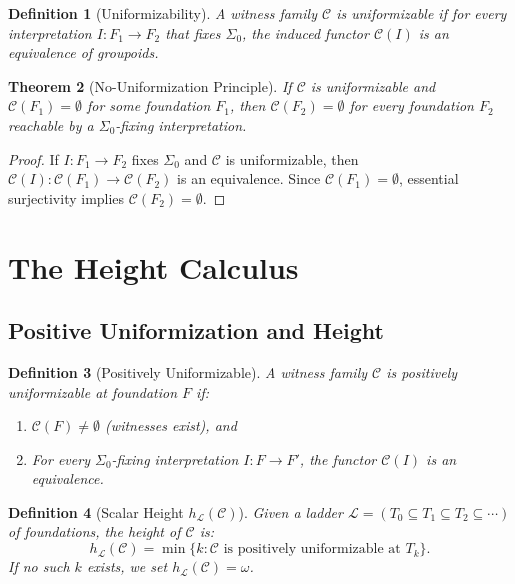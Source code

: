 \documentclass[11pt]{article}
\newtheorem{theorem}{Theorem}[section]
\newtheorem{definition}[theorem]{Definition}
\newcommand{\SigmaZero}{\Sigma_{0}}
\begin{document}
\begin{definition}[Uniformizability]\label{def:uniformizable}
A witness family $\mathcal{C}$ is \emph{uniformizable} if for every interpretation $I: F_1 \to F_2$ that fixes $\SigmaZero$, the induced functor $\mathcal{C}(I)$ is an equivalence of groupoids.
\end{definition}

\begin{theorem}[No-Uniformization Principle]\label{thm:no-unif}
If $\mathcal{C}$ is uniformizable and $\mathcal{C}(F_1) = \emptyset$ for some foundation $F_1$, then $\mathcal{C}(F_2) = \emptyset$ for every foundation $F_2$ reachable by a $\SigmaZero$-fixing interpretation.
\end{theorem}
\begin{proof}
If $I: F_1 \to F_2$ fixes $\SigmaZero$ and $\mathcal{C}$ is uniformizable, then $\mathcal{C}(I): \mathcal{C}(F_1) \to \mathcal{C}(F_2)$ is an equivalence. Since $\mathcal{C}(F_1) = \emptyset$, essential surjectivity implies $\mathcal{C}(F_2) = \emptyset$.
\end{proof}

\section{The Height Calculus}

\subsection{Positive Uniformization and Height}

\begin{definition}[Positively Uniformizable]
A witness family $\mathcal{C}$ is \emph{positively uniformizable} at foundation $F$ if:
\begin{enumerate}
\item $\mathcal{C}(F) \neq \emptyset$ (witnesses exist), and
\item For every $\SigmaZero$-fixing interpretation $I: F \to F'$, the functor $\mathcal{C}(I)$ is an equivalence.
\end{enumerate}
\end{definition}

\begin{definition}[Scalar Height \(h_{\mathcal L}(\mathcal C)\)]
Given a ladder $\mathcal{L} = (T_0 \subseteq T_1 \subseteq T_2 \subseteq \cdots)$ of foundations, the \emph{height} of $\mathcal{C}$ is:
\[
h_{\mathcal L}(\mathcal{C}) = \min\{k : \mathcal{C} \text{ is positively uniformizable at } T_k\}.
\]
If no such $k$ exists, we set $h_{\mathcal L}(\mathcal{C}) = \omega$.
\end{definition}
\end{document}
